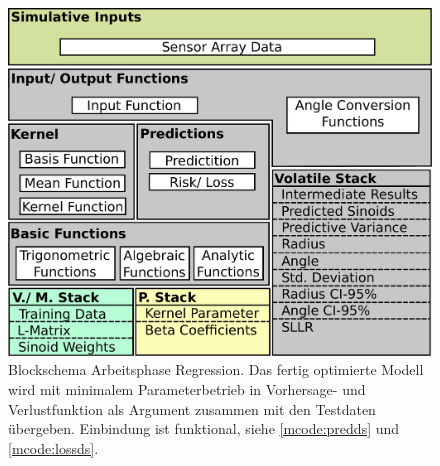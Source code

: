\vspace{5mm}
\begin{figure}[tbph]
	\centering
	\includegraphics[width=0.7\linewidth]{chapters/images/3-SW-E-OExp/Blockschema_Workphase}
	\caption[Blockschema Arbeitsphase Regression]{Blockschema Arbeitsphase Regression. Das fertig optimierte Modell wird mit minimalem Parameterbetrieb in Vorhersage- und Verlustfunktion als Argument zusammen mit den Testdaten übergeben. Einbindung ist funktional, siehe \autoref{mcode:predds} und \autoref{mcode:lossds}.}
	\label{fig:blockschemaworkphase}
\end{figure}

